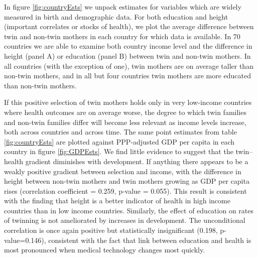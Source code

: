 \documentclass{nature}
\begin{document}
\begin{linenumbers}
In figure \ref{fig:countryEsts} we unpack estimates for variables which are widely measured in birth and demographic data.  For both education and height (important correlates or stocks of health)\cite{Silventoinen2003,BhalotraRawlings2013,Kenkel1991,CutlerLlerasMuney2010}, we plot the average difference between twin and non-twin mothers in each country for which data is available.  In 70 countries we are able to examine both country income level and the difference in height (panel A) or education (panel B) between twin and non-twin mothers.  In all countries (with the exception of one), twin mothers are on average taller than non-twin mothers, and in all but four countries twin mothers are more educated than non-twin mothers.

If this positive selection of twin mothers holds only in very low-income countries where health outcomes are on average worse, the degree to which twin families and non-twin families differ will become less relevant as income levels increase, both across countries and across time.   The same point estimates from table \ref{fig:countryEsts} are plotted against PPP-adjusted GDP per capita in each country in figure \ref{fig:GDPEsts}.  We find little evidence to suggest that the twin--health gradient diminishes with development.  If anything there appears to be a weakly positive gradient between selection and income, with the difference in height between non-twin mothers and twin mothers growing as GDP per capita rises (correlation coefficient = 0.259, p-value = 0.055).   This result is consistent with the finding that height is a better indicator of health in high income countries than in low income countries\cite{Deaton2007}.  Similarly, the effect of education on rates of twinning is not ameliorated by increases in development.  The unconditional correlation is once again positive but statistically insignificant (0.198, p-value=0.146), consistent with the fact that link between education and health is most pronounced when medical technology changes most quickly\cite{LlerasMuneyGlied2008}.


\end{linenumbers}
\end{document}
